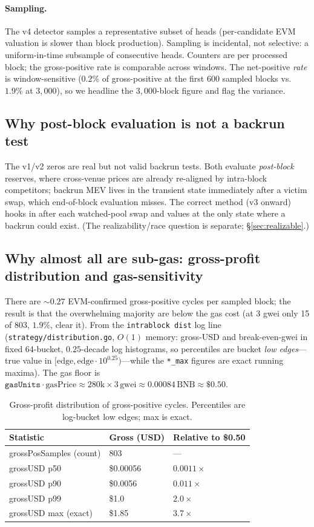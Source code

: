\documentclass[11pt]{article}
\newcommand{\code}[1]{\texttt{#1}}
\begin{document}
\paragraph{Sampling.} The v4 detector samples a representative subset of heads
(per-candidate EVM valuation is slower than block production). Sampling is
incidental, not selective: a uniform-in-time subsample of consecutive heads.
Counters are per processed block; the gross-positive rate is comparable across
windows. The net-positive \emph{rate} is window-sensitive ($0.2\%$ of gross-positive
at the first $600$ sampled blocks vs.\ $1.9\%$ at $3{,}000$), so we headline the
$3{,}000$-block figure and flag the variance.

\subsection{Why post-block evaluation is not a backrun test}
\label{sec:postblock}
The v1/v2 zeros are real but not valid backrun tests. Both evaluate \emph{post-block}
reserves, where cross-venue prices are already re-aligned by intra-block competitors;
backrun MEV lives in the transient state immediately after a victim swap, which
end-of-block evaluation misses. The correct method (v3 onward) hooks in after each
watched-pool swap and values at the only state where a backrun could exist. (The
realizability/race question is separate; \S\ref{sec:realizable}.)

\subsection{Why almost all are sub-gas: gross-profit distribution and gas-sensitivity}
There are $\sim$$0.27$ EVM-confirmed gross-positive cycles per sampled block; the
result is that the overwhelming majority are below the gas cost (at 3 gwei only 15
of 803, $1.9\%$, clear it). From the \code{intrablock dist} log
line (\code{strategy/distribution.go}, $O(1)$ memory: gross-USD and break-even-gwei
in fixed 64-bucket, $0.25$-decade log histograms, so percentiles are bucket
\emph{low edges}---true value in $[\text{edge},\text{edge}\cdot 10^{0.25})$---while
the \code{*\_max} figures are exact running maxima). The gas floor is
$\code{gasUnits}\cdot\text{gasPrice}\approx 280\text{k}\times 3\,\text{gwei}\approx
0.00084\,\text{BNB}\approx \$0.50$.

\begin{table}[h]\centering
\caption{Gross-profit distribution of gross-positive cycles. Percentiles are
log-bucket low edges; max is exact.}\label{tab:gross}
\begin{tabular}{lll}
\toprule
Statistic & Gross (USD) & Relative to \$0.50 \\
\midrule
grossPosSamples (count) & 803 & --- \\
grossUSD p50 & \$0.00056 & $0.0011\times$ \\
grossUSD p90 & \$0.0056 & $0.011\times$ \\
grossUSD p99 & \$1.0 & $2.0\times$ \\
grossUSD max (exact) & \$1.85 & $3.7\times$ \\
\bottomrule
\end{tabular}
\end{table}
\end{document}
